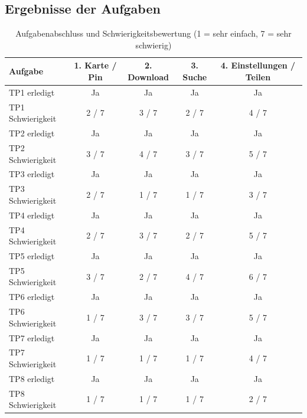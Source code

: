 \subsection{Ergebnisse der Aufgaben}

\begin{table}[H]
  \centering
  \begin{tabular}{|l|c|c|c|c|}
    \hline
    \textbf{Aufgabe} & \textbf{1. Karte / Pin} & \textbf{2. Download} & \textbf{3. Suche} & \textbf{4. Einstellungen / Teilen} \\
    \hline
    TP1 erledigt & Ja & Ja & Ja & Ja \\
    \hline
    TP1 Schwierigkeit & 2 / 7 & 3 / 7 & 2 / 7 & 4 / 7 \\
    \hline
    TP2 erledigt & Ja & Ja & Ja & Ja \\
    \hline
    TP2 Schwierigkeit & 3 / 7 & 4 / 7 & 3 / 7 & 5 / 7 \\
    \hline
    TP3 erledigt & Ja & Ja & Ja & Ja \\
    \hline
    TP3 Schwierigkeit & 2 / 7 & 1 / 7 & 1 / 7 & 3 / 7 \\
    \hline
    TP4 erledigt & Ja & Ja & Ja & Ja  \\
    \hline
    TP4 Schwierigkeit & 2 / 7 & 3 / 7 & 2 / 7 & 5 / 7 \\
    \hline
    TP5 erledigt & Ja  & Ja & Ja & Ja  \\
    \hline
    TP5 Schwierigkeit & 3 / 7 & 2 / 7 & 4 / 7 & 6 / 7 \\
    \hline
    TP6 erledigt & Ja & Ja & Ja & Ja \\
    \hline
    TP6 Schwierigkeit & 1 / 7 & 3 / 7 & 3 / 7 & 5 / 7 \\
    \hline
      TP7 erledigt & Ja & Ja & Ja & Ja \\
    \hline
      TP7 Schwierigkeit & 1 / 7 & 1 / 7 & 1 / 7 & 4 / 7 \\
    \hline
      TP8 erledigt & Ja & Ja & Ja & Ja \\
    \hline
      TP8 Schwierigkeit & 1 / 7 & 1 / 7 & 1 / 7 & 2 / 7 \\
    \hline
  \end{tabular}
  \caption{Aufgabenabschluss und Schwierigkeitsbewertung (1 = sehr einfach, 7 = sehr schwierig)}
  \label{tab:tasks}
\end{table}


